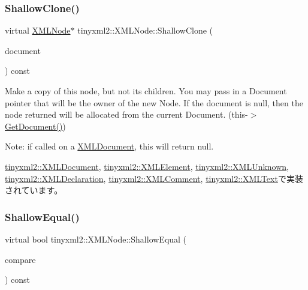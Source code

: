 \subsubsection{\texorpdfstring{Shallow\+Clone()}{ShallowClone()}}
{\footnotesize\ttfamily virtual \hyperlink{classtinyxml2_1_1_x_m_l_node}{X\+M\+L\+Node}$\ast$ tinyxml2\+::\+X\+M\+L\+Node\+::\+Shallow\+Clone (\begin{DoxyParamCaption}\item[{\hyperlink{classtinyxml2_1_1_x_m_l_document}{X\+M\+L\+Document} $\ast$}]{document }\end{DoxyParamCaption}) const\hspace{0.3cm}{\ttfamily [pure virtual]}}

Make a copy of this node, but not its children. You may pass in a Document pointer that will be the owner of the new Node. If the \textquotesingle{}document\textquotesingle{} is null, then the node returned will be allocated from the current Document. (this-\/$>$\hyperlink{classtinyxml2_1_1_x_m_l_node_af343d1ef0b45c0020e62d784d7e67a68}{Get\+Document()})

Note\+: if called on a \hyperlink{classtinyxml2_1_1_x_m_l_document}{X\+M\+L\+Document}, this will return null. 

\hyperlink{classtinyxml2_1_1_x_m_l_document_aa37cc1709d7e1e988bc17dcfb24a69b8}{tinyxml2\+::\+X\+M\+L\+Document}, \hyperlink{classtinyxml2_1_1_x_m_l_element_aafa2807a45b28fe096b29d76e6a13b7c}{tinyxml2\+::\+X\+M\+L\+Element}, \hyperlink{classtinyxml2_1_1_x_m_l_unknown_ab73b48b819aa4b2ef3815dc2d7d20d5f}{tinyxml2\+::\+X\+M\+L\+Unknown}, \hyperlink{classtinyxml2_1_1_x_m_l_declaration_ad9d60e6d2df75c13eb6bf7319985b747}{tinyxml2\+::\+X\+M\+L\+Declaration}, \hyperlink{classtinyxml2_1_1_x_m_l_comment_adf5b5c0319351dcc339df098d11e8fb2}{tinyxml2\+::\+X\+M\+L\+Comment}, \hyperlink{classtinyxml2_1_1_x_m_l_text_a86d265c93152726c8c6831e9594840e6}{tinyxml2\+::\+X\+M\+L\+Text}で実装されています。

\mbox{\label{classtinyxml2_1_1_x_m_l_node_a7ce18b751c3ea09eac292dca264f9226}} 
\subsubsection{\texorpdfstring{Shallow\+Equal()}{ShallowEqual()}}
{\footnotesize\ttfamily virtual bool tinyxml2\+::\+X\+M\+L\+Node\+::\+Shallow\+Equal (\begin{DoxyParamCaption}\item[{const \hyperlink{classtinyxml2_1_1_x_m_l_node}{X\+M\+L\+Node} $\ast$}]{compare }\end{DoxyParamCaption}) const\hspace{0.3cm}{\ttfamily [pure virtual]}}

